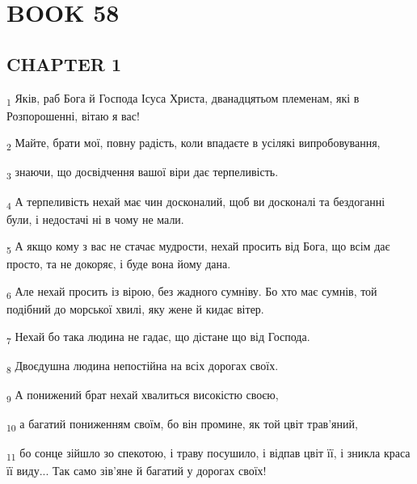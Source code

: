 \section{BOOK 58}
\subsection{CHAPTER 1}
\begin{tcolorbox}
\textsubscript{1} Яків, раб Бога й Господа Ісуса Христа, дванадцятьом племенам, які в Розпорошенні, вітаю я вас!
\end{tcolorbox}
\begin{tcolorbox}
\textsubscript{2} Майте, брати мої, повну радість, коли впадаєте в усілякі випробовування,
\end{tcolorbox}
\begin{tcolorbox}
\textsubscript{3} знаючи, що досвідчення вашої віри дає терпеливість.
\end{tcolorbox}
\begin{tcolorbox}
\textsubscript{4} А терпеливість нехай має чин досконалий, щоб ви досконалі та бездоганні були, і недостачі ні в чому не мали.
\end{tcolorbox}
\begin{tcolorbox}
\textsubscript{5} А якщо кому з вас не стачає мудрости, нехай просить від Бога, що всім дає просто, та не докоряє, і буде вона йому дана.
\end{tcolorbox}
\begin{tcolorbox}
\textsubscript{6} Але нехай просить із вірою, без жадного сумніву. Бо хто має сумнів, той подібний до морської хвилі, яку жене й кидає вітер.
\end{tcolorbox}
\begin{tcolorbox}
\textsubscript{7} Нехай бо така людина не гадає, що дістане що від Господа.
\end{tcolorbox}
\begin{tcolorbox}
\textsubscript{8} Двоєдушна людина непостійна на всіх дорогах своїх.
\end{tcolorbox}
\begin{tcolorbox}
\textsubscript{9} А понижений брат нехай хвалиться високістю своєю,
\end{tcolorbox}
\begin{tcolorbox}
\textsubscript{10} а багатий пониженням своїм, бо він промине, як той цвіт трав'яний,
\end{tcolorbox}
\begin{tcolorbox}
\textsubscript{11} бо сонце зійшло зо спекотою, і траву посушило, і відпав цвіт її, і зникла краса її виду... Так само зів'яне й багатий у дорогах своїх!
\end{tcolorbox}
